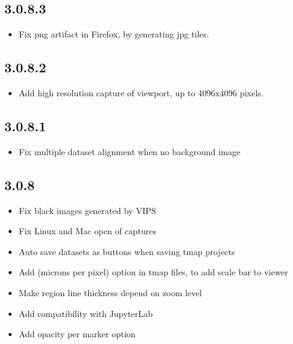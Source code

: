 \documentclass[letterpaper,10pt,english,openany,oneside]{sphinxmanual}
\begin{document}
\subsection{3.0.8.3}
\label{\detokenize{docs/intro/versions:id3}}\begin{itemize}
\item {} 
\sphinxAtStartPar
Fix png artifact in Firefox, by generating jpg tiles.

\end{itemize}


\subsection{3.0.8.2}
\label{\detokenize{docs/intro/versions:id4}}\begin{itemize}
\item {} 
\sphinxAtStartPar
Add high resolution capture of viewport, up to 4096x4096 pixels.

\end{itemize}


\subsection{3.0.8.1}
\label{\detokenize{docs/intro/versions:id5}}\begin{itemize}
\item {} 
\sphinxAtStartPar
Fix multiple dataset alignment when no background image

\end{itemize}


\subsection{3.0.8}
\label{\detokenize{docs/intro/versions:id6}}\begin{itemize}
\item {} 
\sphinxAtStartPar
Fix black images generated by VIPS

\item {} 
\sphinxAtStartPar
Fix Linux and Mac open of captures

\item {} 
\sphinxAtStartPar
Auto save datasets as buttons when saving tmap projects

\item {} 
\sphinxAtStartPar
Add  (microns per pixel) option in tmap files, to add scale bar to viewer

\item {} 
\sphinxAtStartPar
Make region line thickness depend on zoom level

\item {} 
\sphinxAtStartPar
Add compatibility with JupyterLab

\item {} 
\sphinxAtStartPar
Add opacity per marker option

\end{itemize}
\end{document}
